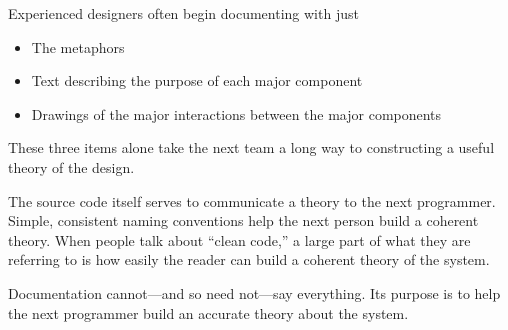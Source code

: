 \documentclass[12pt,letterpaper,twocolumn]{article}
\begin{document}
Experienced designers often begin documenting with just
\begin{itemize}
\item The metaphors
\item Text describing the purpose of each major component
\item Drawings of the major interactions between the major components
\end{itemize}
These three items alone take the next team a long way to constructing a useful theory of the design.

The source code itself serves to communicate a theory to the next programmer. Simple, consistent naming conventions help the next person build a coherent theory. When people talk about ``clean code,'' a large part of what they are referring to is how easily the reader can build a coherent theory of the system.

Documentation cannot---and so need not---say everything. Its purpose is to help the next programmer build an accurate theory about the system.
\end{document}
